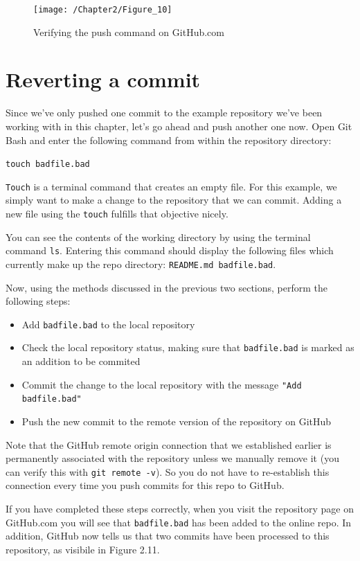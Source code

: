 \documentclass{book}
\begin{document}
\begin{figure}[h]
	\caption{Verifying the push command on GitHub.com}
	\centering\texttt{[image: /Chapter2/Figure\_10]}
\end{figure}

\section{Reverting a commit}
Since we've only pushed one commit to the example repository we've been working with in this chapter, let's go ahead and push another one now. Open Git Bash and enter the following command from within the repository directory:

\texttt{touch badfile.bad}

\texttt{Touch} is a terminal command that creates an empty file. For this example, we simply want to make a change to the repository that we can commit. Adding a new file using the \texttt{touch} fulfills that objective nicely.

You can see the contents of the working directory by using the terminal command \texttt{ls}. Entering this command should display the following files which currently make up the repo directory: \texttt{README.md badfile.bad}.

Now, using the methods discussed in the previous two sections, perform the following steps:

\begin{itemize}
	\item Add \texttt{badfile.bad} to the local repository
	\item Check the local repository status, making sure that \texttt{badfile.bad} is marked as an addition to be commited
	\item Commit the change to the local repository with the message \texttt{"Add badfile.bad"}
	\item Push the new commit to the remote version of the repository on GitHub
\end{itemize}

Note that the GitHub remote origin connection that we established earlier is permanently associated with the repository unless we manually remove it (you can verify this with \texttt{git remote -v}). So you do not have to re-establish this connection every time you push commits for this repo to GitHub.

If you have completed these steps correctly, when you visit the repository page on GitHub.com you will see that \texttt{badfile.bad} has been added to the online repo. In addition, GitHub now tells us that two commits have been processed to this repository, as visibile in Figure 2.11.
\end{document}
